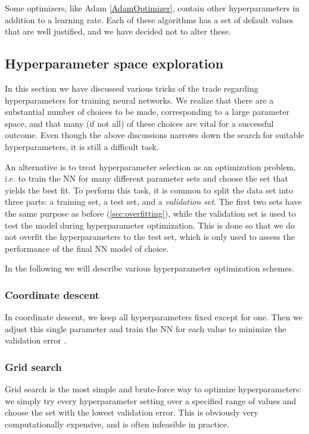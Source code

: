 \documentclass[twoside,english]{uiofysmaster}
\begin{document}
Some optimizers, like Adam \eqref{AdamOptimizer}, contain other hyperparameters in addition to a learning rate.  
Each of these algorithms has a set of default values that are well justified, and we have decided not to alter these. 


\subsection{Hyperparameter space exploration} \label{sec:optimizingHyperparameters}
In this section we have discussed various tricks of the trade regarding hyperparameters for training neural networks. 
We realize that there are a substantial number of choices to be made, corresponding to a large parameter space, and 
that many (if not all) of these choices are vital for a successful outcome. Even though the above discussions narrows down the search 
for suitable hyperparameters, it is still a difficult task. 

An alternative is to treat hyperparameter selection as an optimization problem, i.e. to train the NN for many different 
parameter sets and choose the set that yields the best fit. To perform this task, it is common to split the data set 
into three parts: a training set, a test set, and a \textit{validation set}. The first two sets have the same 
purpose as before (\autoref{sec:overfitting}), while the validation set is used to test the model during hyperparameter 
optimization. This is done so that we do not overfit the hyperparameters to the test set, which is only used to assess 
the performance of the final NN model of choice.

In the following we will describe various hyperparameter optimization schemes. 

\subsubsection{Coordinate descent}
In coordinate descent, we keep all hyperparameters fixed except for one. Then we adjust this single parameter and train the NN
for each value to minimize the validation error  .

\subsubsection{Grid search}
Grid search is the most simple and brute-force way to optimize hyperparameters: we simply try every hyperparameter setting 
over a specified range of values and choose the set with the lowest validation error. This is obviously very computationally 
expensive, and is often infeasible in practice. 
\end{document}
